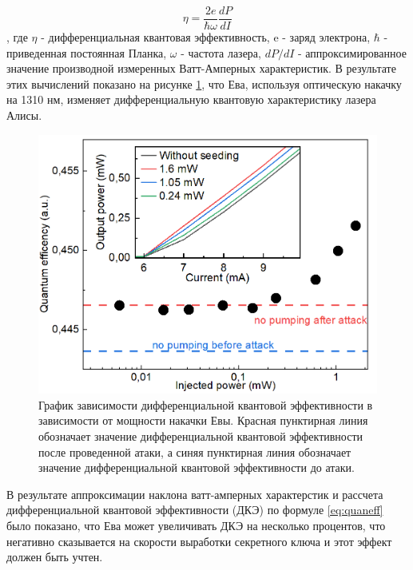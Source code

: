 \begin{equation}
\eta = \frac{2e}{\hbar\omega}\frac{dP}{dI}
\label{eq:quaneff}
\end{equation}, 
где $\eta$ - дифференциальная квантовая эффективность, e - заряд электрона, $\hbar$ - приведенная постоянная Планка, $\omega$ - частота лазера, $dP/dI$ - аппроксимированное значение производной измеренных Ватт-Амперных характеристик.
В результате этих вычислений показано на рисунке \ref{fig:diff quant eff ch4}, что Ева, используя оптическую накачку на 1310 нм, изменяет дифференциальную квантовую характеристику лазера Алисы.
\begin{figure}
    \centering
    \includegraphics{images/Эффективность 1310.png}
    \caption{График зависимости дифференциальной квантовой эффективности в зависимости от мощности накачки Евы. Красная пунктирная линия обозначает значение дифференциальной квантовой эффективности после проведенной атаки, а синяя пунктирная линия обозначает значение дифференциальной квантовой эффективности до атаки.}
    \label{fig:diff quant eff ch4}
\end{figure}
В результате аппроксимации наклона ватт-амперных характерстик и рассчета дифференциальной квантовой эффективности (ДКЭ) по формуле \ref{eq:quaneff} было показано, что Ева может увеличивать ДКЭ на несколько процентов, что негативно сказывается на скорости выработки секретного ключа и этот эффект должен быть учтен. 

